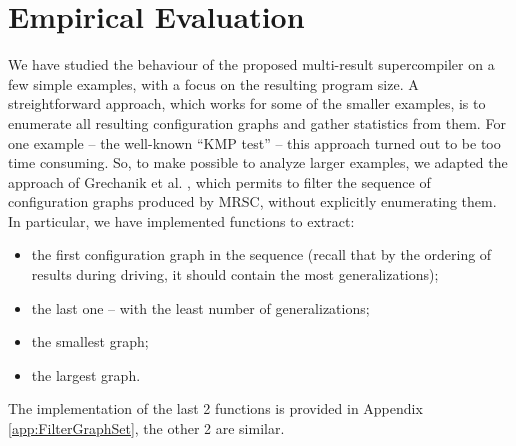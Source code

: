 \documentclass[submission,copyright,creativecommons]{eptcs}
\begin{document}
\section{Empirical Evaluation}\label{sec:EmpEval}

We have studied the behaviour of the proposed multi-result supercompiler on a few simple
examples, with a focus on the resulting program size.
A streightforward approach, which works for some of the smaller examples,
is to enumerate all resulting configuration graphs and gather statistics from them.
For one example -- the well-known ``KMP test'' -- this approach turned out to be too
time consuming.
So, to make possible to analyze larger examples, we adapted the approach 
of Grechanik et al. \cite{Romanenko2014StagedMRSC}, which permits to filter
the sequence of configuration graphs produced by MRSC, without explicitly
enumerating them.
In particular, we have implemented functions to extract:
\begin{itemize}
  \item the first configuration graph in the sequence (recall that by the ordering of 
    results during driving, it should contain the most generalizations);
  \item the last one -- with the least number of generalizations;
  \item the smallest graph;
  \item the largest graph.
\end{itemize}
The implementation of the last 2 functions is provided in Appendix \ref{app:FilterGraphSet},
the other 2 are similar.
\end{document}
